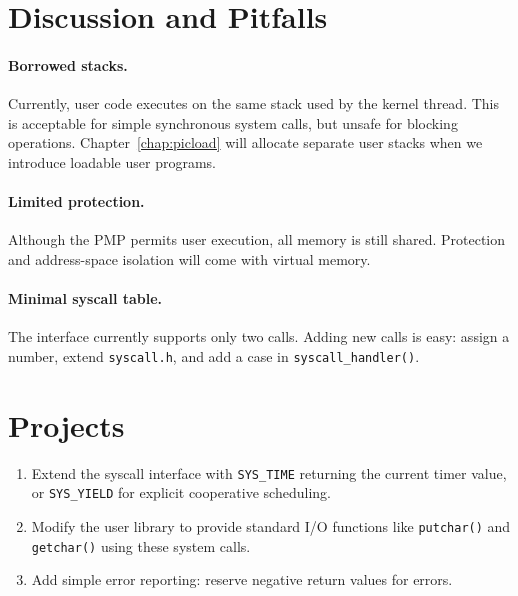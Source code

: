 \section{Discussion and Pitfalls}

\paragraph{Borrowed stacks.}
Currently, user code executes on the same stack used by the kernel thread.
This is acceptable for simple synchronous system calls, but unsafe for blocking
operations.  Chapter~\ref{chap:picload} will allocate separate user stacks when
we introduce loadable user programs.

\paragraph{Limited protection.}
Although the PMP permits user execution, all memory is still shared.
Protection and address-space isolation will come with virtual memory.

\paragraph{Minimal syscall table.}
The interface currently supports only two calls.
Adding new calls is easy: assign a number, extend \texttt{syscall.h}, and add a
case in \texttt{syscall\_handler()}.

\section*{Projects}

\begin{enumerate}
  \item Extend the syscall interface with \texttt{SYS\_TIME} returning the current
        timer value, or \texttt{SYS\_YIELD} for explicit cooperative scheduling.
  \item Modify the user library to provide standard I/O functions like
        \texttt{putchar()} and \texttt{getchar()} using these system calls.
  \item Add simple error reporting: reserve negative return values for errors.
\end{enumerate}
